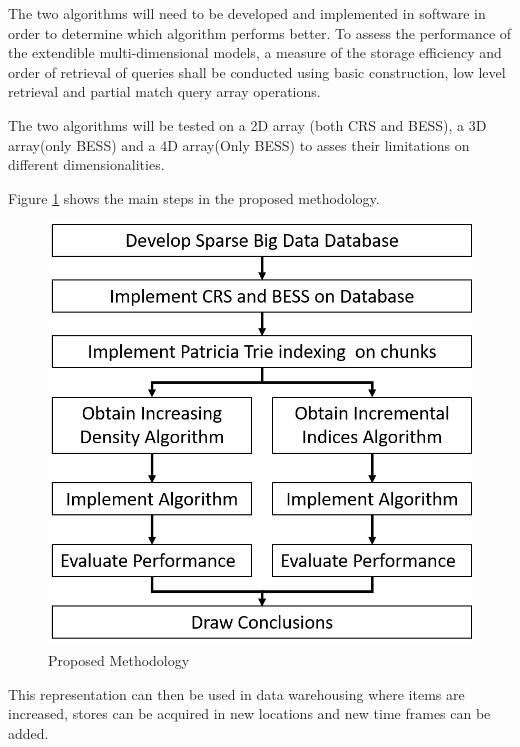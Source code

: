  The two algorithms will need to be developed and implemented in software in order to determine which algorithm performs better. To assess the performance of the extendible multi-dimensional models, a measure of the storage efficiency and order of retrieval of queries shall be conducted using basic construction, low level retrieval and partial match query array operations.
 
 The two algorithms will be tested on a 2D array (both CRS and BESS), a 3D array(only BESS) and a 4D array(Only BESS) to asses their limitations on different dimensionalities.
 
 Figure \ref{fig:proposedmethod} shows the main steps in the proposed methodology.
 
 \begin{figure}[H]
 	\centering
 	\includegraphics[width=0.7\linewidth]{proposedMethod2}
 	\caption{Proposed Methodology}
 	\label{fig:proposedmethod}
 \end{figure}
 
This representation can then be used in data warehousing where items are increased, stores can be acquired in new locations and new time frames can be added.
